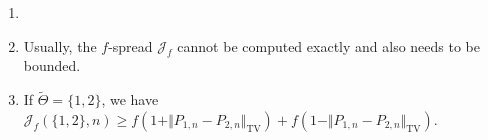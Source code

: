 \documentclass[a4paper]{article}
\begin{document}
\begin{remark}
	\begin{enumerate}
		\item[]
		\item Usually, the $f$-spread $\mathcal{J}_{f}$ cannot be computed exactly and also needs to be bounded.
		\item If $\tilde{\Theta}=\{1,2\}$, we have $\mathcal{J}_f(\{1,2\}, n) \geq f(1 + \Vert P_{1,n}-P_{2,n} \Vert_{\mathrm{TV}}) + f(1 - \Vert P_{1,n}-P_{2,n} \Vert_{\mathrm{TV}})$.
	\end{enumerate}
\end{remark}







\end{document}
